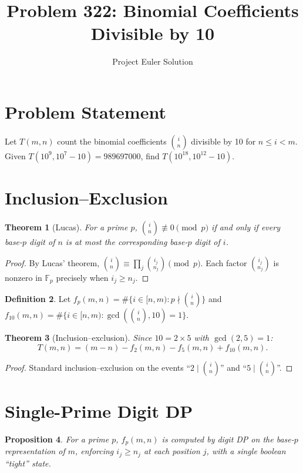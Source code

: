 \documentclass[12pt]{article}
\title{Problem 322: Binomial Coefficients Divisible by 10}
\author{Project Euler Solution}
\date{}
\newtheorem{theorem}{Theorem}
\newtheorem{proposition}[theorem]{Proposition}
\theoremstyle{definition}
\newtheorem{definition}[theorem]{Definition}
\begin{document}
\maketitle

\section{Problem Statement}
Let $T(m,n)$ count the binomial coefficients $\binom{i}{n}$ divisible by 10 for $n\le i<m$.  Given $T(10^9,10^7-10)=989697000$, find $T(10^{18},10^{12}-10)$.

\section{Inclusion--Exclusion}

\begin{theorem}[Lucas]\label{thm:lucas}
For a prime $p$, $\binom{i}{n}\not\equiv 0\pmod{p}$ if and only if every base-$p$ digit of $n$ is at most the corresponding base-$p$ digit of $i$.
\end{theorem}

\begin{proof}
By Lucas' theorem, $\binom{i}{n}\equiv\prod_j\binom{i_j}{n_j}\pmod{p}$.  Each factor $\binom{i_j}{n_j}$ is nonzero in $\mathbb{F}_p$ precisely when $i_j\ge n_j$.
\end{proof}

\begin{definition}
Let $f_p(m,n)=\#\{i\in[n,m):p\nmid\binom{i}{n}\}$ and $f_{10}(m,n)=\#\{i\in[n,m):\gcd(\binom{i}{n},10)=1\}$.
\end{definition}

\begin{theorem}[Inclusion--exclusion]\label{thm:ie}
Since $10=2\times 5$ with $\gcd(2,5)=1$:
\[
T(m,n)=(m-n)-f_2(m,n)-f_5(m,n)+f_{10}(m,n).
\]
\end{theorem}

\begin{proof}
Standard inclusion--exclusion on the events ``$2\mid\binom{i}{n}$'' and ``$5\mid\binom{i}{n}$''.
\end{proof}

\section{Single-Prime Digit DP}

\begin{proposition}\label{prop:single}
For a prime $p$, $f_p(m,n)$ is computed by digit DP on the base-$p$ representation of $m$, enforcing $i_j\ge n_j$ at each position $j$, with a single boolean ``tight'' state.
\end{proposition}
\end{document}
